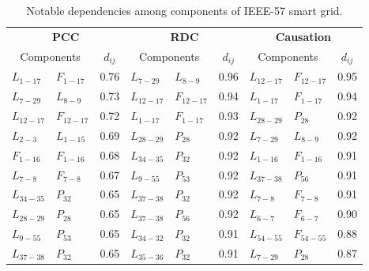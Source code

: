\begin{table}[H]
\centering
\caption{Notable dependencies among components of IEEE-57 smart grid.}
\label{tab:d_ieee57}
\footnotesize
\setlength{\tabcolsep}{2pt}
\begin{tabular}{l@{ - }lc|l@{ - }lc|l@{ - }lc}
\multicolumn{3}{c}{\textbf{PCC}} & \multicolumn{3}{c}{\textbf{RDC}} & \multicolumn{3}{c}{\textbf{Causation}} \\
\multicolumn{2}{c}{Components} & $d_{ij}$ & \multicolumn{2}{c}{Components} & $d_{ij}$ & \multicolumn{2}{c}{Components} & $d_{ij}$ \\ \hline
$L_{1-17}$  & $F_{1-17}$  & 0.76 & $L_{7-29}$  & $L_{8-9}$   & 0.96 & $L_{12-17}$ & $F_{12-17}$ & 0.95 \\
$L_{7-29}$  & $L_{8-9}$   & 0.73 & $L_{12-17}$ & $F_{12-17}$ & 0.94 & $L_{1-17}$  & $F_{1-17}$  & 0.94 \\
$L_{12-17}$ & $F_{12-17}$ & 0.72 & $L_{1-17}$  & $F_{1-17}$  & 0.93 & $L_{28-29}$ & $P_{28}$    & 0.92 \\
$L_{2-3}$   & $L_{1-15}$  & 0.69 & $L_{28-29}$ & $P_{28}$    & 0.92 & $L_{7-29}$  & $L_{8-9}$   & 0.92 \\
$F_{1-16}$  & $F_{1-16}$  & 0.68 & $L_{34-35}$ & $P_{32}$    & 0.92 & $L_{1-16}$  & $F_{1-16}$  & 0.91 \\
$L_{7-8}$   & $F_{7-8}$   & 0.67 & $L_{9-55}$  & $P_{53}$    & 0.92 & $L_{37-38}$ & $P_{56}$    & 0.91 \\
$L_{34-35}$ & $P_{32}$    & 0.65 & $L_{37-38}$ & $P_{32}$    & 0.92 & $L_{7-8}$   & $F_{7-8}$   & 0.91 \\
$L_{28-29}$ & $P_{28}$    & 0.65 & $L_{37-38}$ & $P_{56}$    & 0.92 & $L_{6-7}$   & $F_{6-7}$   & 0.90 \\
$L_{9-55}$  & $P_{53}$    & 0.65 & $L_{34-32}$ & $P_{32}$    & 0.91 & $L_{54-55}$ & $F_{54-55}$ & 0.88 \\
$L_{37-38}$ & $P_{32}$    & 0.65 & $L_{35-36}$ & $P_{32}$    & 0.91 & $L_{7-29}$  & $P_{28}$    & 0.87
\end{tabular}
\end{table} 